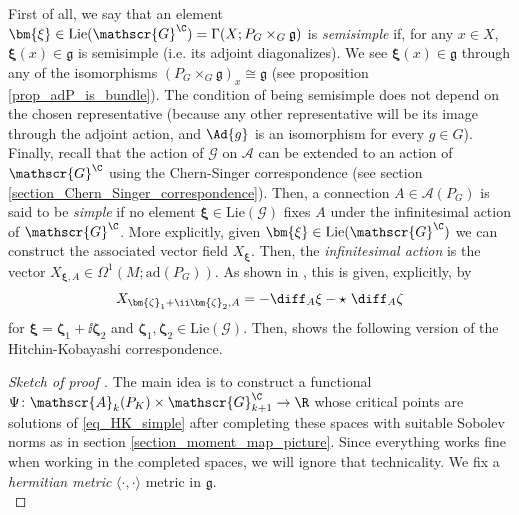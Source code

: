 {First of all, we say that an element \(\bm{\xi} \in \mathrm{Lie}(\mathscr{G}^\C)=\Gamma(X; P_G \times_G \mathfrak{g})\) is \textit{semisimple} if, for any \(x \in X\), \(\bm{\xi}(x)\in \mathfrak{g}\) is semisimple (i.e. its adjoint diagonalizes). We see \(\bm{\xi}(x)\in \mathfrak{g}\) through any of the isomorphisms \((P_G \times_G \mathfrak{g})_x \cong \mathfrak{g}\) (see proposition \ref{prop_adP_is_bundle}). The condition of being semisimple does not depend on the chosen representative (because any other representative will be its image through the adjoint action, and \(\Ad{g}\) is an isomorphism for every \(g \in G\)). Finally, recall that the action of \(\mathscr{G}\) on \(\mathscr{A}\) can be extended to an action of \(\mathscr{G}^\C\) using the Chern-Singer correspondence (see section \ref{section_Chern_Singer_correspondence}). Then, a connection \(A \in \mathscr{A}(P_G)\) is said to be \textit{simple} if no element \(\bm{\xi} \in \mathrm{Lie}(\mathscr{G})\) fixes \(A\) under the infinitesimal action of \(\mathscr{G}^\C\). More explicitly, given \(\bm{\xi}\in \mathrm{Lie}(\mathscr{G}^\C)\) we can construct the associated vector field \(X_{\bm{\xi}}\). Then, the \textit{infinitesimal action} is the vector \(X_{\bm{\xi},A}\in \Omega^1(M;\mathrm{ad}(P_G))\). As shown in \parencite[Prop. 2.3]{trautwein2015surveygitpictureyangmills}, this is given, explicitly, by
\[
X_{\bm{\zeta}_1+ \ii \bm{\zeta}_2, A}=-\diff_A \xi - \star \  \diff_A \zeta
\]
for \(\bm{\xi}=\bm{\zeta}_1 + \ii \bm{\zeta}_2\) and \(\bm{\zeta}_1 , \bm{\zeta}_2 \in \mathrm{Lie}(\mathscr{G})\). Then, \parencite{i1999hitchin} shows the following version of the Hitchin-Kobayashi correspondence.

\begin{proof}[\textit{Sketch of proof} \parencite{i1999hitchin}]
    The main idea is to construct a functional \(\Psi\colon \mathscr{A}_k(P_K) \times \mathscr{G}_{k+1}^\C \to \R\) whose critical points are solutions of \eqref{eq_HK_simple} after completing these spaces with suitable Sobolev norms as in section \ref{section_moment_map_picture}. Since everything works fine when working in the completed spaces, we will ignore that technicality. We fix a \textit{hermitian metric} \(\langle \cdot, \cdot \rangle\) metric in \(\mathfrak{g}\).\\


\end{proof}}
